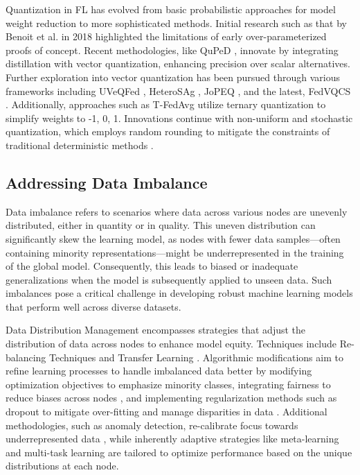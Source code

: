 \documentclass{article}
\begin{document}
Quantization in FL has evolved from basic probabilistic approaches for model weight reduction \cite{konevcny2016federated} to more sophisticated methods. Initial research such as that by Benoit et al. \cite{jacob2018quantization} in 2018 highlighted the limitations of early over-parameterized proofs of concept. Recent methodologies, like QuPeD \cite{ozkara2021quped}, innovate by integrating distillation with vector quantization, enhancing precision over scalar alternatives. Further exploration into vector quantization has been pursued through various frameworks including UVeQFed \cite{shlezinger2020uveqfed}, HeteroSAg \cite{elkordy2022heterosag}, JoPEQ \cite{lang2023joint}, and the latest, FedVQCS \cite{oh2023fedvqcs}. Additionally, approaches such as T-FedAvg \cite{xu2020ternary} utilize ternary quantization to simplify weights to -1, 0, 1. Innovations continue with non-uniform \cite{chen2024communication} and stochastic quantization, which employs random rounding to mitigate the constraints of traditional deterministic methods \cite{li2022federated}.

\subsection{Addressing Data Imbalance}
Data imbalance refers to scenarios where data across various nodes are unevenly distributed, either in quantity or in quality. This uneven distribution can significantly skew the learning model, as nodes with fewer data samples—often containing minority representations—might be underrepresented in the training of the global model. Consequently, this leads to biased or inadequate generalizations when the model is subsequently applied to unseen data. Such imbalances pose a critical challenge in developing robust machine learning models that perform well across diverse datasets.

Data Distribution Management encompasses strategies that adjust the distribution of data across nodes to enhance model equity. Techniques include Re-balancing Techniques and Transfer Learning \cite{Sakho2024TheoreticalAE, lin2017clustering}. Algorithmic modifications aim to refine learning processes to handle imbalanced data better by modifying optimization objectives to emphasize minority classes, integrating fairness to reduce biases across nodes \cite{inproceedings}, and implementing regularization methods such as dropout to mitigate over-fitting and manage disparities in data \cite{pezoulas2024fhbf}. Additional methodologies, such as anomaly detection, re-calibrate focus towards underrepresented data \cite{Singh2020AnomalyDU}, while inherently adaptive strategies like meta-learning\cite{hospedales2021meta,huisman2021survey} and multi-task learning\cite{mills2021multi} are tailored to optimize performance based on the unique distributions at each node.\par
\end{document}
